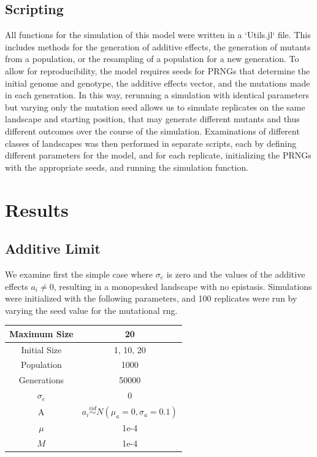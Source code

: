 \documentclass[paper=a4, fontsize=11pt,twoside]{scrartcl}       %
\begin{document}
\subsection*{Scripting}

All functions for the simulation of this model were written in a `Utils.jl` file. This includes methods for the generation of additive effects, the generation of mutants from a population, or the resampling of a population for a new generation. To allow for reproducibility, the model requires seeds for PRNGs that determine the initial genome and genotype, the additive effects vector, and the mutations made in each generation. In this way, rerunning a simulation with identical parameters but varying only the mutation seed allows us to simulate replicates on the same landscape and starting position, that may generate different mutants and thus different outcomes over the course of the simulation. Examinations of different classes of landscapes was then performed in separate scripts, each by defining different parameters for the model, and for each replicate, initializing the PRNGs with the appropriate seeds, and running the simulation function.

\section*{Results}

\subsection*{Additive Limit}

We examine first the simple case where $\sigma_{e}$ is zero and the values of the additive effects $a_i \neq 0$, resulting in a monopeaked landscape with no epistasis. Simulations were initialized with the following parameters, and 100 replicates were run by varying the seed value for the mutational rng.

\begin{center}
    \begin{tabular}{ | c | c | }
	\hline
	Maximum Size & 20 \\ \hline
	Initial Size & 1, 10, 20 \\ \hline
	Population & 1000 \\ \hline
	Generations & 50000 \\ \hline
	$\sigma_e$ & 0 \\ \hline
	A & $a_i \overset{iid}{\sim} N(\mu_a = 0, \sigma_a = 0.1)$ \\ \hline
	$\mu$  & 1e-4 \\ \hline
	$M$ & 1e-4 \\ \hline
    \end{tabular}
\end{center}
\end{document}
